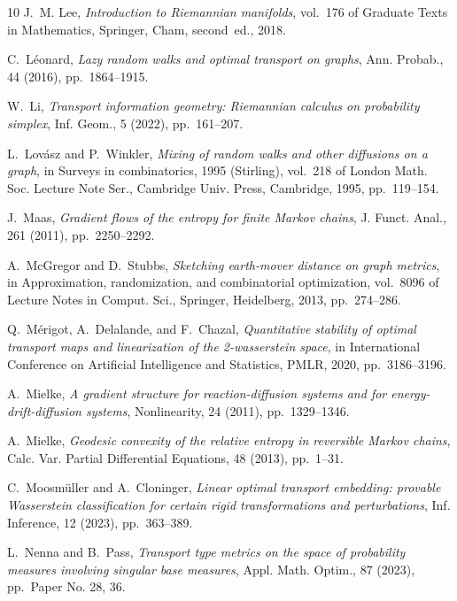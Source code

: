 \documentclass[11pt,a4paper]{article}
\begin{document}
\begin{thebibliography}{10}
    {\sc J.~M. Lee}, {\em Introduction to {R}iemannian manifolds}, vol.~176 of Graduate Texts in Mathematics, Springer, Cham, second~ed., 2018.

    {\sc C.~L\'eonard}, {\em Lazy random walks and optimal transport on graphs}, Ann. Probab., 44 (2016), pp.~1864--1915.

    {\sc W.~Li}, {\em Transport information geometry: {R}iemannian calculus on probability simplex}, Inf. Geom., 5 (2022), pp.~161--207.

    {\sc L.~Lov\'asz and P.~Winkler}, {\em Mixing of random walks and other diffusions on a graph}, in Surveys in combinatorics, 1995 ({S}tirling), vol.~218 of London Math. Soc. Lecture Note Ser., Cambridge Univ. Press, Cambridge, 1995, pp.~119--154.

    {\sc J.~Maas}, {\em Gradient flows of the entropy for finite {M}arkov chains}, J. Funct. Anal., 261 (2011), pp.~2250--2292.

    {\sc A.~McGregor and D.~Stubbs}, {\em Sketching earth-mover distance on graph metrics}, in Approximation, randomization, and combinatorial optimization, vol.~8096 of Lecture Notes in Comput. Sci., Springer, Heidelberg, 2013, pp.~274--286.

    {\sc Q.~M{\'e}rigot, A.~Delalande, and F.~Chazal}, {\em Quantitative stability of optimal transport maps and linearization of the 2-wasserstein space}, in International Conference on Artificial Intelligence and Statistics, PMLR, 2020, pp.~3186--3196.

    {\sc A.~Mielke}, {\em A gradient structure for reaction-diffusion systems and for energy-drift-diffusion systems}, Nonlinearity, 24 (2011), pp.~1329--1346.

    {\sc A.~Mielke}, {\em Geodesic convexity of the relative entropy in reversible {M}arkov chains}, Calc. Var. Partial Differential Equations, 48 (2013), pp.~1--31.

    {\sc C.~Moosm\"uller and A.~Cloninger}, {\em Linear optimal transport embedding: provable {W}asserstein classification for certain rigid transformations and perturbations}, Inf. Inference, 12 (2023), pp.~363--389.

    {\sc L.~Nenna and B.~Pass}, {\em Transport type metrics on the space of probability measures involving singular base measures}, Appl. Math. Optim., 87 (2023), pp.~Paper No. 28, 36.


\end{thebibliography}
\end{document}
